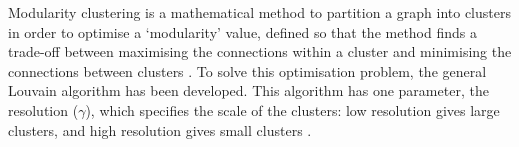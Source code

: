 Modularity clustering is a mathematical method to partition a graph into clusters in order to optimise a `modularity' value, defined so that the method finds a trade-off between maximising the connections within a cluster and minimising the connections between clusters \parencite{newmanModularityCommunityStructure2006}.
To solve this optimisation problem, the general Louvain algorithm \parencite{blondelFastUnfoldingCommunities2008,muchaCommunityStructureTimeDependent2010} has been developed.
This algorithm has one parameter, the resolution ($\gamma$), which specifies the scale of the clusters: low resolution gives large clusters, and high resolution gives small clusters \parencite{fortunatoResolutionLimitCommunity2007}.


